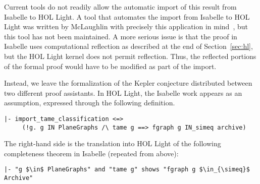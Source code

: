 Current tools do not readily allow the automatic import of this result
from Isabelle to HOL Light.  A tool that automates the import from
Isabelle to HOL Light was written by McLaughlin with precisely this
application in mind~\cite{McLaughlin:2006:IJCAR}, but this tool has
not been maintained.  A more serious issue is that the proof in
Isabelle uses computational reflection as described at the end of
Section~\ref{sec:hl}, but the HOL Light kernel does not permit
reflection.  Thus, the reflected portions of the formal proof would
have to be modified as part of the import.

Instead, we leave the formalization of the Kepler conjecture
distributed between two different proof assistants.  In HOL Light, the
Isabelle work appears as an assumption, expressed through the
following definition.
\begin{obeylines}

\begin{verbatim}
|- import_tame_classification <=>
     (!g. g IN PlaneGraphs /\ tame g ==> fgraph g IN_simeq archive)
\end{verbatim}

\end{obeylines}
The right-hand side is the translation into HOL Light of the following
completeness theorem in Isabelle (repeated from above):




\begin{lstlisting}[keepspaces=true,stringstyle=\tt,basicstyle=\small,%
frame=none,framesep=8pt,mathescape,morekeywords={and,shows},columns=flexible]
|- "g $\in$ PlaneGraphs" and "tame g" shows "fgraph g $\in_{\simeq}$ Archive"
\end{lstlisting}


